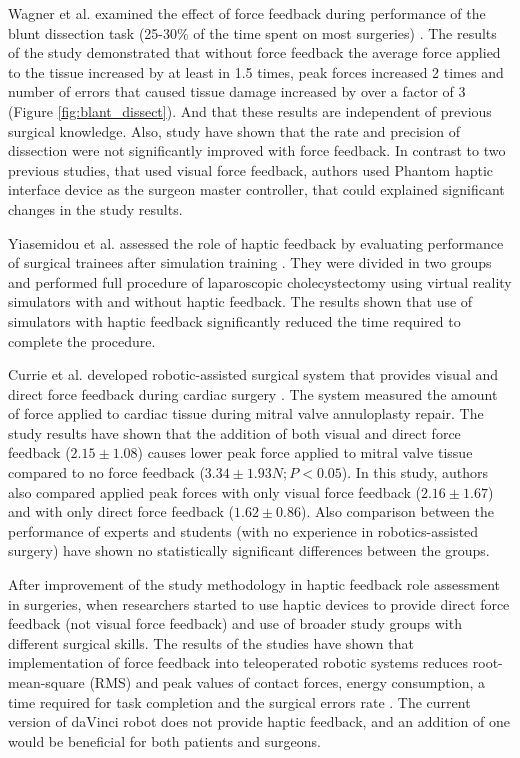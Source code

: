 Wagner et al. examined the effect of force feedback during performance of the blunt dissection task (25-30\% of the time spent on most surgeries)  \cite{wagner_benefit_2007}.  The results of the study demonstrated that without force feedback the average force applied to the tissue increased by at least in 1.5 times, peak forces increased 2 times and number of errors that caused tissue damage increased by over a factor of 3 (Figure \ref{fig:blant_dissect}). And that these results are  independent of previous surgical knowledge. Also, study have shown that the rate and precision of dissection were not significantly improved with force feedback. In contrast to two previous studies, that used visual force feedback, authors used Phantom haptic interface device as the surgeon master controller, that could explained significant changes in the study results. 

Yiasemidou et al. assessed the role of haptic feedback by evaluating performance of surgical trainees after simulation training \cite{yiasemidou_faster_2011}. They were divided in two groups and performed full procedure of laparoscopic cholecystectomy using virtual reality simulators with and without haptic feedback.  The results shown that use of simulators with haptic feedback significantly reduced the time required to complete the procedure.

Currie et al. developed robotic-assisted surgical system that provides visual and direct force feedback during cardiac surgery \cite{currie_role_2017}. The system measured the amount of force applied to cardiac tissue during mitral valve annuloplasty repair. The study results have shown that the addition of both visual and direct force feedback ($2.15 \pm 1.08$) causes lower peak force applied to mitral valve tissue compared to no force feedback ($3.34 \pm 1.93 N; P < 0.05$). In this study, authors also compared applied peak forces with only visual force feedback ($2.16 \pm 1.67$) and with only direct force feedback ($1.62 \pm 0.86$). Also comparison between the performance of experts and students (with no experience in robotics-assisted surgery) have shown no statistically significant differences between the groups.  

After improvement of the study methodology in haptic feedback role assessment in surgeries, when researchers started to use haptic devices to provide direct force feedback (not visual force feedback) and use of broader study groups with different surgical skills. The results of the studies \cite{wagner_benefit_2007, yiasemidou_faster_2011, currie_role_2017} have shown that implementation of force feedback into teleoperated robotic systems reduces root-mean-square (RMS) and peak values of contact forces, energy consumption, a time required for task completion and the surgical errors rate \cite{tavakoli_haptics_2008}. The current version of daVinci robot does not provide haptic feedback, and an addition of one would be beneficial for both patients and surgeons.

